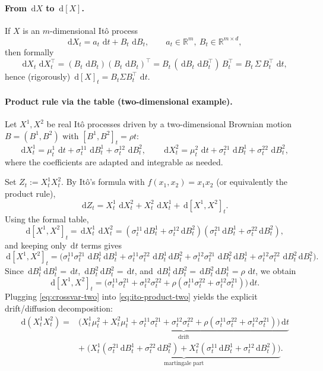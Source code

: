 \documentclass[11pt]{article}
\newcommand{\R}{\mathbb{R}}
\newcommand{\dd}{\,\mathrm{d}}
\newcommand{\1}{\mathbf{1}}
\theoremstyle{plain}
\theoremstyle{definition}
\theoremstyle{remark}
\begin{document}
\medskip
\paragraph{From $\dd X$ to $\dd[X]$.}
If $X$ is an $m$-dimensional It\^o process
\[
\dd X_t = a_t\,\dd t + B_t\,\dd B_t,
\qquad a_t\in\R^m,\ B_t\in\R^{m\times d},
\]
then formally
\[
\dd X_t\,\dd X_t^\top
=
(B_t\,\dd B_t)(B_t\,\dd B_t)^\top
=
B_t\,(\dd B_t\,\dd B_t^\top)\,B_t^\top
=
B_t\,\Sigma\,B_t^\top\,\dd t,
\]
hence (rigorously) $\dd[X]_t = B_t\Sigma B_t^\top\,\dd t$.

\paragraph{Product rule via the table (two-dimensional example).}
Let $X^1,X^2$ be real It\^o processes driven by a two-dimensional Brownian motion
$B=(B^1,B^2)$ with $[B^1,B^2]_t=\rho t$:
\[
\dd X_t^1 = \mu_t^1\,\dd t + \sigma_t^{11}\,\dd B_t^1 + \sigma_t^{12}\,\dd B_t^2,
\qquad
\dd X_t^2 = \mu_t^2\,\dd t + \sigma_t^{21}\,\dd B_t^1 + \sigma_t^{22}\,\dd B_t^2,
\]
where the coefficients are adapted and integrable as needed.

Set $Z_t := X_t^1 X_t^2$. By It\^o's formula with $f(x_1,x_2)=x_1x_2$ (or equivalently the product rule),
\begin{equation}\label{eq:ito-product-two}
\dd Z_t
=
X_t^1\,\dd X_t^2
+
X_t^2\,\dd X_t^1
+
\dd[X^1,X^2]_t.
\end{equation}
Using the formal table,
\[
\dd[X^1,X^2]_t
=
\dd X_t^1\,\dd X_t^2
=
(\sigma_t^{11}\dd B_t^1+\sigma_t^{12}\dd B_t^2)(\sigma_t^{21}\dd B_t^1+\sigma_t^{22}\dd B_t^2),
\]
and keeping only $\dd t$ terms gives
\[
\dd[X^1,X^2]_t
=
\Big(
\sigma_t^{11}\sigma_t^{21}\,\dd B_t^1\dd B_t^1
+
\sigma_t^{11}\sigma_t^{22}\,\dd B_t^1\dd B_t^2
+
\sigma_t^{12}\sigma_t^{21}\,\dd B_t^2\dd B_t^1
+
\sigma_t^{12}\sigma_t^{22}\,\dd B_t^2\dd B_t^2
\Big).
\]
Since $\dd B_t^1\dd B_t^1=\dd t$, $\dd B_t^2\dd B_t^2=\dd t$, and
$\dd B_t^1\dd B_t^2=\dd B_t^2\dd B_t^1=\rho\,\dd t$, we obtain
\begin{equation}\label{eq:crossvar-two}
\dd[X^1,X^2]_t
=
\Big(
\sigma_t^{11}\sigma_t^{21}
+
\sigma_t^{12}\sigma_t^{22}
+
\rho(\sigma_t^{11}\sigma_t^{22}+\sigma_t^{12}\sigma_t^{21})
\Big)\dd t.
\end{equation}
Plugging \eqref{eq:crossvar-two} into \eqref{eq:ito-product-two} yields the explicit drift/diffusion decomposition:
\begin{align*}
\dd(X_t^1X_t^2)
=
&\underbrace{\Big(
X_t^1\mu_t^2 + X_t^2\mu_t^1
+
\sigma_t^{11}\sigma_t^{21}
+
\sigma_t^{12}\sigma_t^{22}
+
\rho(\sigma_t^{11}\sigma_t^{22}+\sigma_t^{12}\sigma_t^{21})
\Big)\dd t}_{\text{drift}}
\\
\;&+\;
\underbrace{\Big(
X_t^1(\sigma_t^{21}\dd B_t^1+\sigma_t^{22}\dd B_t^2)
+
X_t^2(\sigma_t^{11}\dd B_t^1+\sigma_t^{12}\dd B_t^2)
\Big)}_{\text{martingale part}}.
\end{align*}
\end{document}
